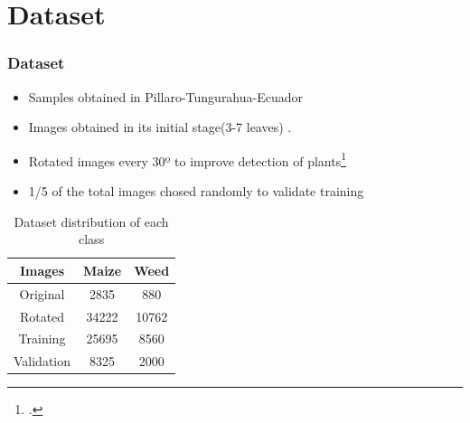 \documentclass[10pt,a4paper]{beamer}
\begin{document}
\section{Dataset}
\begin{frame}
\frametitle{Dataset}
\begin{itemize}
\item Samples obtained in Pillaro-Tungurahua-Ecuador
\item Images obtained in its initial stage(3-7 leaves) . %
\item Rotated images every 30º to improve detection of plants\footcite{sladojevic2016deep}%
\item 1/5 of the total images chosed randomly to validate training%
\end{itemize}
\begin{table}[h!]
\renewcommand{\arraystretch}{1.3}
\caption{Dataset distribution of each class}
\label{table:1}
\centering
\begin{tabular}{| c c c |} 
 \hline
 \textbf{Images} & \textbf{Maize} & \textbf{Weed}  \\ [1ex] 
 \hline
 Original  & 2835 & 880 \\ 
 Rotated & 34222 & 10762 \\ 
 Training & 25695 & 8560 \\
 Validation & 8325 & 2000 \\
 \hline
\end{tabular}
\end{table}
\end{frame}

\end{document}
